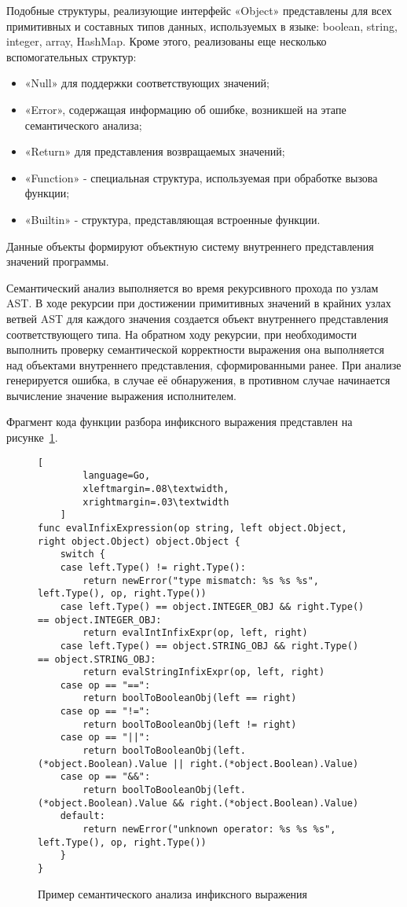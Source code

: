 Подобные структуры, реализующие интерфейс «Object» представлены для всех примитивных и составных типов данных, используемых в языке:
boolean, string, integer, array, HashMap.
Кроме этого, реализованы еще несколько вспомогательных структур:

\begin{itemize}
    \item «Null» для поддержки соответствующих значений;
    \item «Error», содержащая информацию об ошибке, возникшей на этапе семантического анализа;
    \item «Return» для представления возвращаемых значений;
    \item «Function» - специальная структура, используемая при обработке вызова функции;
    \item «Builtin» - структура, представляющая встроенные функции.
\end{itemize}

Данные объекты формируют объектную систему внутреннего представления значений программы.

Семантический анализ выполняется во время рекурсивного прохода по узлам AST.
В ходе рекурсии при достижении примитивных значений в крайних узлах ветвей AST для каждого значения создается объект  внутреннего представления соответствующего типа.
На обратном ходу рекурсии, при необходимости выполнить проверку семантической корректности выражения она выполняется над объектами внутреннего представления, сформированными ранее.
При анализе генерируется ошибка, в случае её обнаружения, в противном случае начинается вычисление значение выражения исполнителем.

Фрагмент кода функции разбора инфиксного выражения представлен на рисунке~\ref{f:code_semantic}.

\clearpage

\begin{figure}[ht]
	\centering
	\vspace{\toppaddingoffigure}
	\begin{lstlisting}[
        language=Go,
        xleftmargin=.08\textwidth,
        xrightmargin=.03\textwidth
    ]
func evalInfixExpression(op string, left object.Object, right object.Object) object.Object {
    switch {
    case left.Type() != right.Type():
        return newError("type mismatch: %s %s %s", left.Type(), op, right.Type())
    case left.Type() == object.INTEGER_OBJ && right.Type() == object.INTEGER_OBJ:
        return evalIntInfixExpr(op, left, right)
    case left.Type() == object.STRING_OBJ && right.Type() == object.STRING_OBJ:
        return evalStringInfixExpr(op, left, right)
    case op == "==":
        return boolToBooleanObj(left == right)
    case op == "!=":
        return boolToBooleanObj(left != right)
    case op == "||":
        return boolToBooleanObj(left.(*object.Boolean).Value || right.(*object.Boolean).Value)
    case op == "&&":
        return boolToBooleanObj(left.(*object.Boolean).Value && right.(*object.Boolean).Value)
    default:
        return newError("unknown operator: %s %s %s", left.Type(), op, right.Type())
    }
}
\end{lstlisting}
	\caption{Пример семантического анализа инфиксного выражения}
	\label{f:code_semantic}
\end{figure}